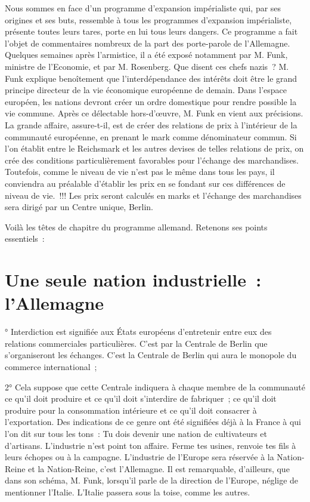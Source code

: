 \documentclass[french,twoside]{book} %
\begin{document}
Nous sommes en face d’un programme d’expansion impérialiste qui, par ses origines et ses buts, ressemble à tous les programmes d’expansion impérialiste, présente toutes leurs tares, porte en lui tous leurs dangers. Ce programme a fait l’objet de commentaires nombreux de la part des porte-parole de l’Allemagne. Quelques semaines après l’armistice, il a été exposé notamment par M. Funk, ministre de l’Economie, et par M. Rosenberg. Que disent ces chefs nazis ? M. Funk explique benoîtement que l’interdépendance des intérêts doit être le grand principe directeur de la vie économique européenne de demain. Dans l’espace européen, les nations devront créer un ordre domestique pour rendre possible la vie commune. Après ce délectable hors-d’œuvre, M. Funk en vient aux précisions. La grande affaire, assure-t-il, est de créer des relations de prix à l’intérieur de la communauté européenne, en prenant le mark comme dénominateur commun. Si l’on établit entre le Reichsmark et les autres devises de telles relations de prix, on crée des conditions particulièrement favorables pour l’échange des marchandises. Toutefois, comme le niveau de vie n’est pas le même dans tous les pays, il conviendra au préalable d’établir les prix en se fondant sur ces différences de niveau de vie. !!! Les prix seront calculés en marks et l’échange des marchandises sera dirigé par un Centre unique, Berlin.\par
Voilà les têtes de chapitre du programme allemand. Retenons ses points essentiels :
\section[{Une seule nation industrielle : l’Allemagne}]{Une seule nation industrielle : l’Allemagne}
° Interdiction est signifiée aux États européens d’entretenir entre eux des relations commerciales particulières. C’est par la Centrale de Berlin que s’organiseront les échanges. C’est la Centrale de Berlin qui aura le monopole du commerce international ;\par
2° Cela suppose que cette Centrale indiquera à chaque membre de la communauté ce qu’il doit produire et ce qu’il doit s’interdire de fabriquer ; ce qu’il doit produire pour la consommation intérieure et ce qu’il doit consacrer à l’exportation. Des indications de ce genre ont été signifiées déjà à la France à qui l’on dit sur tous les tons : Tu dois devenir une nation de cultivateurs et d’artisans. L’industrie n’est point ton affaire. Ferme tes usines, renvoie tes fils à leurs échopes ou à la campagne. L’industrie de l’Europe sera réservée à la Nation-Reine et la Nation-Reine, c’est l’Allemagne. Il est remarquable, d’ailleurs, que dans son schéma, M. Funk, lorsqu’il parle de la direction de l’Europe, néglige de mentionner l’Italie. L’Italie passera sous la toise, comme les autres.
\end{document}
